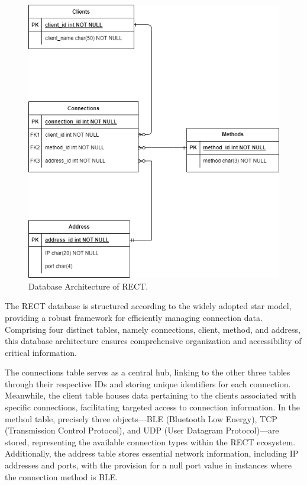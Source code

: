 \begin{figure}
	\centering

	\includegraphics[width=\textwidth]{img/RECT-erd}

	\caption{Database Architecture of RECT.}
	\label{fig:db-architecture}
\end{figure}



The RECT database is structured according to the widely adopted star model, providing a robust framework for efficiently managing connection data. Comprising four distinct 
tables, namely connections, client, method, and address, this database architecture ensures comprehensive organization and accessibility of critical information.\newline

The connections table serves as a central hub, linking to the other three tables through their respective IDs and storing unique identifiers for each connection. 
Meanwhile, the client table houses data pertaining to the clients associated with specific connections, facilitating targeted access to connection information. In the 
method table, precisely three objects—BLE (Bluetooth Low Energy), TCP (Transmission Control Protocol), and UDP (User Datagram Protocol)—are stored, representing the 
available connection types within the RECT ecosystem. Additionally, the address table stores essential network information, including IP addresses and ports, with the 
provision for a null port value in instances where the connection method is BLE.\newline

